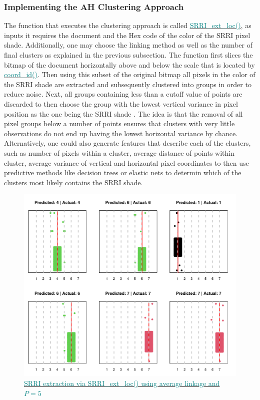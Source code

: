 \documentclass[aodsor,preprint]{imsart}
\numberwithin{equation}{section}
\theoremstyle{plain}
\begin{document}
\subsubsection{Implementing the AH Clustering Approach}
The function that executes the clustering approach is called \href{https://github.com/Base-R-Best-R/KID/blob/main/Code/Package/KIDs/R/SRRI_ext_loc.R}{\textcolor{teal}{SRRI\_ext\_loc()}}, as inputs it requires the document and the Hex code of the color of the SRRI pixel shade. Additionally, one may choose the linking method as well as the number of final clusters as explained in the previous subsection. The function first slices the bitmap of the document horizontally above and below the scale that is located by \href{https://github.com/Base-R-Best-R/KID/blob/main/Code/Package/KIDs/R/coord_id.R}{\textcolor{teal}{coord\_id()}}. Then using this subset of the original bitmap all pixels in the color of the SRRI shade are extracted and subsequently clustered into groups in order to reduce noise. Next, all groups containing less than a cutoff value of points are discarded to then choose the group with the lowest vertical variance in pixel position as the one being the SRRI shade \citep{datatable}. The idea is that the removal of all pixel groups below a number of points ensures that clusters with very little observations do not end up having the lowest horizontal variance by chance. Alternatively, one could also generate features that describe each of the clusters, such as number of pixels within a cluster, average distance of points within cluster, average variance of vertical and horizontal pixel coordinates to then use predictive methods like decision trees or elastic nets to determin which of the clusters most likely contains the SRRI shade.

\begin{figure}[H]
	\includegraphics[width = 12cm]{Ersteextr.pdf}
	\caption{\href{https://github.com/Base-R-Best-R/KID/blob/main/Code/Tests/Test_ext_Function.pdf}{\textcolor{teal}{SRRI extraction via SRRI\_ext\_loc() using average linkage and $P = 5$}}}
	\label{fig6}
\end{figure}
\end{document}
